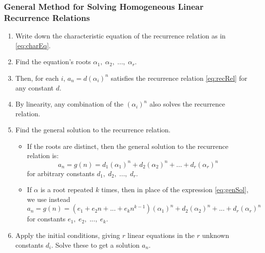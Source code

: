 \newpage\noindent{}


\subsubsection{General Method for Solving Homogeneous Linear Recurrence Relations}

\begin{enumerate}
    \item Write down the characteristic equation of the recurrence relation as in \eqref{eq:charEq}.
    \item Find the equation's roots \(\alpha_1,\;\alpha_2,\;...,\;\alpha_r\).
    \item Then, for each \(i\), \(a_n = d(\alpha_i)^n\) satisfies the recurrence relation \eqref{eq:recRel} for any constant \(d\).
    \item By linearity, any combination of the \((\alpha_i)^n\) also solves the recurrence relation.
    \item Find the general solution to the recurrence relation. 
    \begin{itemize}
        \item If the roots are distinct, then the general solution to the recurrence relation is:
        \begin{equation}\label{eq:genSol}
            a_n = g(n) = d_1(\alpha_1)^n + d_2(\alpha_2)^n + ... + d_r(\alpha_r)^n
        \end{equation}
        for arbitrary constants \(d_1,\;d_2,\;...,\;d_r\).
        \item If \(\alpha\) is a root repeated \(k\) times, then in place of the expression \eqref{eq:genSol}, we use instead
        \begin{equation}
            a_n = g(n) = (e_1 + e_2n + ... + e_kn^{k-1})(\alpha_1)^n + d_{2}(\alpha_2)^n + ... + d_r(\alpha_r)^n
        \end{equation}
        for constants \(e_1,\;e_2,\;...,\;e_k\).
    \end{itemize} 
    \item Apply the initial conditions, giving \(r\) linear equations in the \(r\) unknown constants \(d_i\). Solve these to get a solution \(a_n\).
\end{enumerate}

